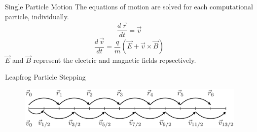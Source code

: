 \documentclass[aspectratio=169, 16pt]{beamer}
\newcommand{\diff}[2]{
    \frac{d #1}{d #2}
}
\begin{document}
\begin{frame}{Single Particle Motion}
  \vfill{}
  \centering
  The equations of motion are solved for each computational particle, individually.
    \centering
      \begin{equation}
        \diff{\,\vec{r}}{t}
        =
        \vec{v}
      \end{equation}
      \begin{equation}
          \diff{\,\vec{v}}{t}
          =
          \frac{q}{m}
          \left(
            \vec{E} +
            \vec{v} \times
            \vec{B}
          \right)
      \end{equation}
    $\vec{E}$ and $\vec{B}$ represent the electric and magnetic fields repsectively.
\end{frame}

\begin{frame}{Leapfrog Particle Stepping}
  \begin{figure}[H]
    \centering
    \includegraphics[width=\textwidth]{figs/BorisVisualization.png}
  \end{figure}
\end{frame}
\end{document}
